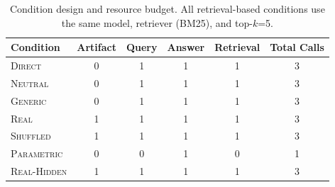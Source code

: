 \begin{table}[t]
\centering
\caption{Condition design and resource budget. All retrieval-based conditions use the same model, retriever (BM25), and top-$k$=5.}
\label{tab:setup}
\small
\begin{tabular}{lccccc}
\toprule
Condition & Artifact & Query & Answer & Retrieval & Total Calls \\
\midrule
\textsc{Direct} & 0 & 1 & 1 & 1 & 3 \\
\textsc{Neutral} & 0 & 1 & 1 & 1 & 3 \\
\textsc{Generic} & 0 & 1 & 1 & 1 & 3 \\
\textsc{Real} & 1 & 1 & 1 & 1 & 3 \\
\textsc{Shuffled} & 1 & 1 & 1 & 1 & 3 \\
\textsc{Parametric} & 0 & 0 & 1 & 0 & 1 \\
\textsc{Real-Hidden} & 1 & 1 & 1 & 1 & 3 \\
\bottomrule
\end{tabular}
\end{table}